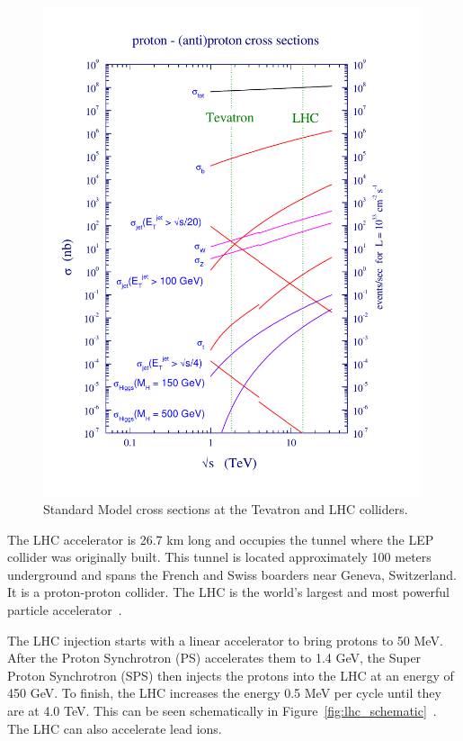 \begin{figure}[htb]                                                               
\begin{center}
\includegraphics[width=0.99\textwidth]{Experiment/lhcolor.pdf}
\end{center}
\vspace*{-1cm}
\caption{Standard Model cross sections at the Tevatron
and LHC colliders.~\cite{Campbell:2006wx}}
\label{fig:lhcall}                    
\end{figure} 



The LHC accelerator is 26.7 km long and occupies the tunnel where the LEP collider was originally built.  This tunnel is located approximately 100 meters underground and spans the French and Swiss boarders near Geneva, Switzerland.  It is a proton-proton collider. The LHC is the world's largest and most powerful particle accelerator~\cite{LHCDesignReport}.

The LHC injection starts with a linear accelerator to bring protons to 50 MeV.  After the Proton Synchrotron (PS) accelerates them to 1.4 GeV, the Super Proton Synchrotron (SPS) then injects the protons into the LHC at an energy of 450 GeV.  To finish, the LHC increases the energy 0.5 MeV per cycle until they are at 4.0 TeV.  This can be seen schematically in Figure~\ref{fig:lhc_schematic}~\cite{CERN_complex}. The LHC can also accelerate lead ions.

